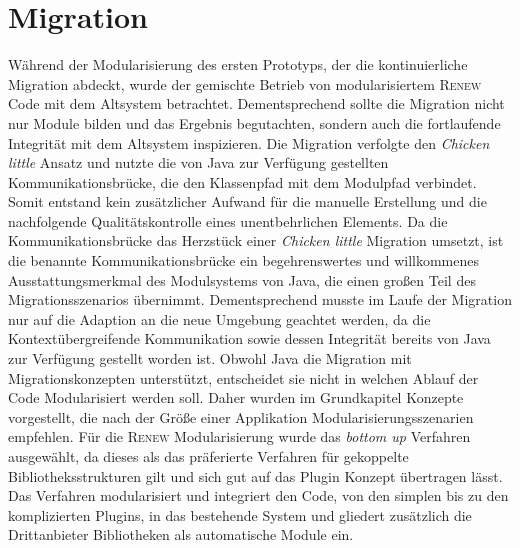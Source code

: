 \section{Migration}
Während der Modularisierung des ersten Prototyps, der die kontinuierliche Migration abdeckt, wurde der gemischte Betrieb von modularisiertem \textsc{Renew} Code mit dem Altsystem betrachtet. Dementsprechend sollte die Migration nicht nur Module bilden und das Ergebnis begutachten, sondern auch die fortlaufende Integrität mit dem Altsystem inspizieren.\newline
Die Migration verfolgte den \textit{Chicken little} Ansatz und nutzte die von Java zur Verfügung gestellten Kommunikationsbrücke, die den Klassenpfad mit dem Modulpfad verbindet. Somit entstand kein zusätzlicher Aufwand für die manuelle Erstellung und die nachfolgende Qualitätskontrolle eines unentbehrlichen Elements. Da die Kommunikationsbrücke das Herzstück einer \textit{Chicken little} Migration umsetzt, ist die benannte Kommunikationsbrücke ein begehrenswertes und willkommenes Ausstattungsmerkmal des Modulsystems von Java, die einen großen Teil des Migrationsszenarios übernimmt. Dementsprechend musste im Laufe der Migration nur auf die Adaption an die neue Umgebung geachtet werden, da die Kontextübergreifende Kommunikation sowie dessen Integrität bereits von Java zur Verfügung gestellt worden ist. \newline
Obwohl Java die Migration mit Migrationskonzepten unterstützt, entscheidet sie nicht in welchen Ablauf der Code Modularisiert werden soll. Daher wurden im Grundkapitel Konzepte vorgestellt, die nach der Größe einer Applikation Modularisierungsszenarien empfehlen. Für die \textsc{Renew} Modularisierung wurde das \textit{bottom up} Verfahren ausgewählt, da dieses als das präferierte Verfahren für gekoppelte Bibliotheksstrukturen gilt und sich gut auf das Plugin Konzept übertragen lässt. Das Verfahren modularisiert und integriert den Code, von den simplen bis zu den komplizierten Plugins, in das bestehende System und gliedert zusätzlich die Drittanbieter Bibliotheken als automatische Module ein.\bigbreak

